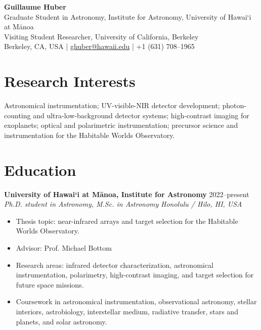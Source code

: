 \documentclass[11pt,letterpaper]{article}
\newcommand{\cvheading}[4]{%
  \textbf{#1} \hfill #2\\
  \textit{#3} \hfill \textit{#4}\par
}
\begin{document}

{\LARGE \textbf{Guillaume Huber}}\\[-1pt]
Graduate Student in Astronomy, Institute for Astronomy, University of Hawai`i at M\=anoa\\
Visiting Student Researcher, University of California, Berkeley\\
Berkeley, CA, USA \; | \; \href{mailto:ghuber@hawaii.edu}{ghuber@hawaii.edu} \; | \; +1 (631) 708--1965\\









\section{Research Interests}
Astronomical instrumentation; UV-visible-NIR detector development; photon-counting and ultra-low-background detector systems; high-contrast imaging for exoplanets; optical and polarimetric instrumentation; precursor science and instrumentation for the Habitable Worlds Observatory.









\section{Education}

\cvheading{University of Hawai`i at M\=anoa, Institute for Astronomy}{2022--present}{Ph.D. student in Astronomy, M.Sc. in Astronomy}{Honolulu / Hilo, HI, USA}
\begin{itemize}
  \item Thesis topic: near-infrared arrays and target selection for the Habitable Worlds Observatory.
  \item Advisor: Prof. Michael Bottom
  \item Research areas: infrared detector characterization, astronomical instrumentation, polarimetry, high-contrast imaging, and target selection for future space missions.
  \item Coursework in astronomical instrumentation, observational astronomy, stellar interiors, astrobiology, interstellar medium, radiative transfer, stars and planets, and solar astronomy.
\end{itemize}
\end{document}
